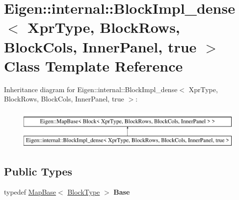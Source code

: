 \hypertarget{class_eigen_1_1internal_1_1_block_impl__dense_3_01_xpr_type_00_01_block_rows_00_01_block_cols_00_01_inner_panel_00_01true_01_4}{}\section{Eigen\+::internal\+::Block\+Impl\+\_\+dense$<$ Xpr\+Type, Block\+Rows, Block\+Cols, Inner\+Panel, true $>$ Class Template Reference}
\label{class_eigen_1_1internal_1_1_block_impl__dense_3_01_xpr_type_00_01_block_rows_00_01_block_cols_00_01_inner_panel_00_01true_01_4}
Inheritance diagram for Eigen\+::internal\+::Block\+Impl\+\_\+dense$<$ Xpr\+Type, Block\+Rows, Block\+Cols, Inner\+Panel, true $>$\+:\begin{figure}[H]
\begin{center}
\leavevmode
\includegraphics[height=2.000000cm]{class_eigen_1_1internal_1_1_block_impl__dense_3_01_xpr_type_00_01_block_rows_00_01_block_cols_00_01_inner_panel_00_01true_01_4}
\end{center}
\end{figure}
\subsection*{Public Types}
\begin{DoxyCompactItemize}
\item 
\mbox{\label{class_eigen_1_1internal_1_1_block_impl__dense_3_01_xpr_type_00_01_block_rows_00_01_block_cols_00_01_inner_panel_00_01true_01_4_a1c15fa6e6d001b1dd257885b13258b2b}} 
typedef \mbox{\hyperlink{class_eigen_1_1_map_base}{Map\+Base}}$<$ \mbox{\hyperlink{class_eigen_1_1_block}{Block\+Type}} $>$ {\bfseries Base}
\end{DoxyCompactItemize}
